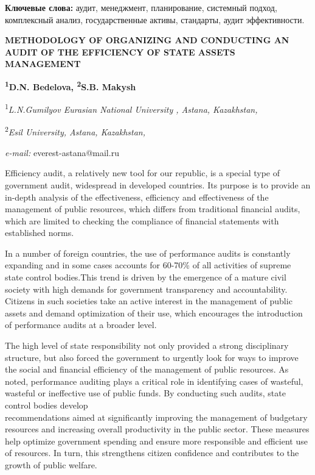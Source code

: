 {\bfseries Ключевые слова:} аудит, менеджмент, планирование, системный
подход, комплексный анализ, государственные активы, стандарты, аудит
эффективности.

\begin{articleheader}
{\bfseries METHODOLOGY OF ORGANIZING AND CONDUCTING AN AUDIT OF THE EFFICIENCY OF STATE ASSETS MANAGEMENT}

{\bfseries
\textsuperscript{1}D.N. Bedelova\textsuperscript{\envelope },
\textsuperscript{2}S.B. Makysh}
\end{articleheader}

\begin{affiliation}
\textsuperscript{1}\emph{L.N.Gumilyov Eurasian National University , Astana, Kazakhstan,}

\textsuperscript{2}\emph{Esil University, Astana, Kazakhstan,}

\emph{e-mail:} everest-astana@mail.ru
\end{affiliation}

Efficiency audit, a relatively new tool for our republic, is a special
type of government audit, widespread in developed countries. Its purpose
is to provide an in-depth analysis of the effectiveness, efficiency and
effectiveness of the management of public resources, which differs from
traditional financial audits, which are limited to checking the
compliance of financial statements with established norms.

In a number of foreign countries, the use of performance audits is
constantly expanding and in some cases accounts for 60-70\% of all
activities of supreme state control bodies.This trend is driven by the
emergence of a mature civil society with high demands for government
transparency and accountability. Citizens in such societies take an
active interest in the management of public assets and demand
optimization of their use, which encourages the introduction of
performance audits at a broader level.

The high level of state responsibility not only provided a strong
disciplinary structure, but also forced the government to urgently look
for ways to improve the social and financial efficiency of the
management of public resources. As noted, performance auditing plays a
critical role in identifying cases of wasteful, wasteful or ineffective
use of public funds. By conducting such audits, state control bodies
develop \\recommendations aimed at significantly improving the management
of budgetary resources and increasing overall productivity in the public
sector. These measures help optimize government spending and ensure more
responsible and efficient use of resources. In turn, this strengthens
citizen confidence and contributes to the growth of public welfare.

